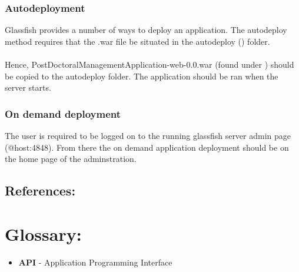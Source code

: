 \documentclass[12pt]{article}
\begin{document}
\subsubsection{Autodeployment}
Glassfish provides a number of ways to deploy an application. The autodeploy method requires that the .war file be situated in the autodeploy (\textbf{}) folder.\\ 
\\
Hence, PostDoctoralManagementApplication-web-0.0.war (found under \textbf{}) should be copied to the autodeploy folder. The application should be ran when the server starts.

\subsubsection{On demand deployment}
The user is required to be logged on to the running glassfish server admin page (@host:4848). From there the on demand application deployment should be on the home page of the adminstration.

\subsection{References:}
\vspace{0.1in}
\vspace{0.5in}


\newpage
\section{Glossary:}
\vspace{0.2in}

\begin{itemize}

\item \textbf{API} - Application Programming Interface
 


\end{itemize}	
\end{document}
